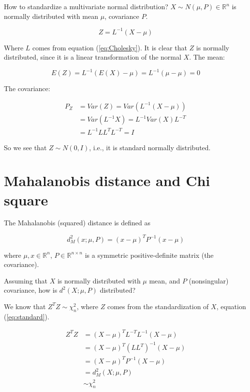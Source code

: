 \documentclass{article}
\begin{document}
How to standardize a multivariate normal distribution? $X \sim N(\mu, P) \in \mathbb{R}^n$ is normally distributed with mean $\mu$, covariance $P$.

\begin{equation}\label{eq:standard}
    \boxed{Z = L^{-1} (X - \mu)}
\end{equation}

Where $L$ comes from equation (\ref{eq:Cholesky}). It is clear that $Z$ is normally distributed, since it is a linear transformation of the normal $X$. The mean:

\begin{equation}
    E(Z) = L^{-1} (E(X) - \mu) = L^{-1} (\mu - \mu) = 0
\end{equation}

The covariance:

\begin{equation}
\begin{split}
    P_Z &= Var(Z) = Var(L^{-1} (X - \mu))\\
    &= Var(L^{-1} X) = L^{-1} Var(X) L^{-T}\\
    &= L^{-1} LL^T L^{-T} = I
\end{split}
\end{equation}

So we see that $Z \sim N(0, I)$, i.e., it is standard normally distributed.

\section{Mahalanobis distance and Chi square}

The Mahalanobis (squared) distance is defined as

\begin{equation}
    d^2_M(x; \mu, P) = (x-\mu)^T P^{-1} (x-\mu)
\end{equation}

where $\mu, x \in \mathbb{R}^n$, $P \in \mathbb{R}^{n\times n}$ is a symmetric positive-definite matrix (the covariance).

Assuming that $X$ is normally distributed with $\mu$ mean, and $P$ (nonsingular) covariance, how is $d^2(X; \mu, P)$ distributed?

We know that $Z^TZ\sim \chi_n^2$, where $Z$ comes from the standardization of $X$, equation (\ref{eq:standard}).

\begin{equation}
    \begin{split}
        Z^T Z &= (X-\mu)^T L^{-T} L^{-1} (X-\mu) \\
        &= (X-\mu)^T (LL^T)^{-1} (X-\mu) \\
        &= (X-\mu)^T P^{-1} (X-\mu) \\
        &= d_M^2(X; \mu, P) \\
        & \sim \chi_n^2
    \end{split}
\end{equation}
\end{document}
